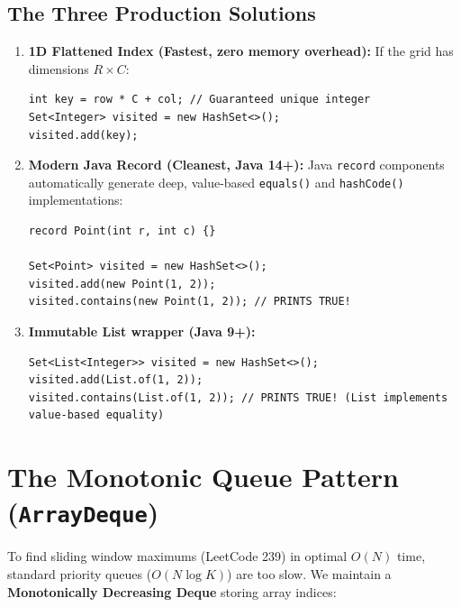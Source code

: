 \documentclass[10pt,journal,compsoc,onecolumn]{IEEEtran}
\begin{document}
\subsection{The Three Production Solutions}
\begin{enumerate}
    \item \textbf{1D Flattened Index (Fastest, zero memory overhead):}
    If the grid has dimensions $R \times C$:
\begin{verbatim}
int key = row * C + col; // Guaranteed unique integer
Set<Integer> visited = new HashSet<>();
visited.add(key);
\end{verbatim}
    \item \textbf{Modern Java Record (Cleanest, Java 14+):}
    Java \texttt{record} components automatically generate deep, value-based \texttt{equals()} and \texttt{hashCode()} implementations:
\begin{verbatim}
record Point(int r, int c) {}

Set<Point> visited = new HashSet<>();
visited.add(new Point(1, 2));
visited.contains(new Point(1, 2)); // PRINTS TRUE!
\end{verbatim}
    \item \textbf{Immutable List wrapper (Java 9+):}
\begin{verbatim}
Set<List<Integer>> visited = new HashSet<>();
visited.add(List.of(1, 2));
visited.contains(List.of(1, 2)); // PRINTS TRUE! (List implements value-based equality)
\end{verbatim}
\end{enumerate}

\section{The Monotonic Queue Pattern (\texttt{ArrayDeque})}
\label{sec:monotonic_queue}

To find sliding window maximums (LeetCode 239) in optimal $O(N)$ time, standard priority queues ($O(N \log K)$) are too slow. We maintain a \textbf{Monotonically Decreasing Deque} storing array indices:
\end{document}
